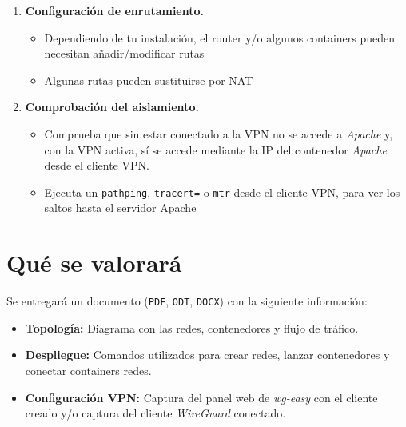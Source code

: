 \documentclass[a4paper]{article}
\begin{document}
\begin{enumerate}
\begin{itemize}
\item Desde el panel web de \emph{wg-easy} (puerto 51821, con un navegador), crea un cliente \emph{WireGuard}, descarga su configuración o código QR y conéctalo.
\item Windows: hay que instalar el \href{https://www.wireguard.com/install/}{cliente wireguard}, e importar el fichero \texttt{conf}
\item Debian: basta con \texttt{apt install wireguard}, y activar el fichero \texttt{conf} con \texttt{wg-quick}
\end{itemize}
\item \textbf{Configuración de enrutamiento.}
\begin{itemize}
\item Dependiendo de tu instalación, el router y/o algunos containers pueden necesitan añadir/modificar rutas
\item Algunas rutas pueden sustituirse por NAT
\end{itemize}
\item \textbf{Comprobación del aislamiento.}
\begin{itemize}
\item Comprueba que sin estar conectado a la VPN no se accede a \emph{Apache} y, con la VPN activa, sí se accede mediante la IP del contenedor \emph{Apache} desde el cliente VPN.
\item Ejecuta un \texttt{pathping}, \texttt{tracert=} o \texttt{mtr} desde el cliente VPN, para ver los saltos hasta el servidor Apache
\end{itemize}
\end{enumerate}
\section{Qué se valorará}
\label{sec:org000000c}

Se entregará un documento (\texttt{PDF}, \texttt{ODT}, \texttt{DOCX}) con la siguiente información:

\begin{itemize}
\item \textbf{Topología:} Diagrama con las redes, contenedores y flujo de tráfico.
\item \textbf{Despliegue:} Comandos utilizados para crear redes, lanzar contenedores y conectar containers redes.
\item \textbf{Configuración VPN:} Captura del panel web de \emph{wg-easy} con el cliente creado y/o captura del cliente \emph{WireGuard} conectado.
\end{itemize}
\end{document}
